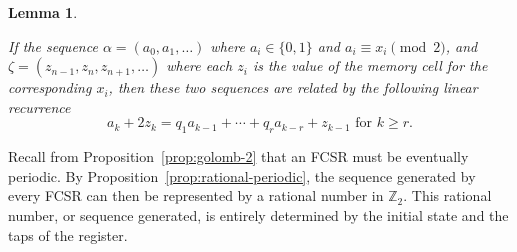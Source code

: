 \documentclass[english]{article}
\def\zzz{\mathbb{Z}}
\theoremstyle{plain}
\newtheorem{lemma}[theorem]{Lemma}%
\theoremstyle{definition}
\theoremstyle{remark}
\begin{document}
\begin{lemma}\label{lem:linear-recur}
\par If the sequence $\alpha=(a_0,a_1,\dots)$ where $a_i\in\{0,1\}$ and
$a_i\equiv x_i\pmod2$, and $\zeta=(z_{n-1},z_n,z_{n+1},\dots)$ where each
$z_i$ is the value of the memory cell for the corresponding $x_i$, then
these two sequences are related by the following linear recurrence
\begin{equation}\label{eqn:lin-rec}
  a_k+2z_k=q_1a_{k-1}+\cdots+q_ra_{k-r}+z_{k-1} \text{ for } k\geq r.
\end{equation}
\end{lemma}

\par Recall from Proposition~\ref{prop:golomb-2} that an FCSR must be
eventually periodic. By Proposition~\ref{prop:rational-periodic}, the sequence
generated by every FCSR can then be represented by a rational number in
$\zzz_2$. This rational number, or sequence generated, is entirely determined by
the initial state and the taps of the register.
\end{document}
